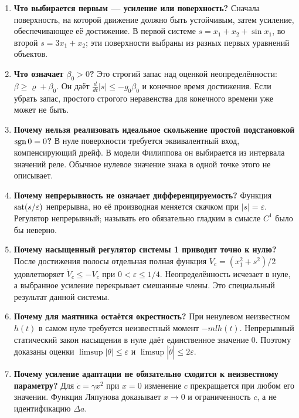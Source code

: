 \begin{enumerate}[resume]
\item \textbf{Что выбирается первым --- усиление или поверхность?}
Сначала поверхность, на которой движение должно быть устойчивым, затем
усиление, обеспечивающее её достижение. В первой системе
$s=x_1+x_2+\sin x_1$, во второй $s=3x_1+x_2$; эти поверхности выбраны
из разных первых уравнений объектов.

\item \textbf{Что означает $\beta_0>0$?}
Это строгий запас над оценкой неопределённости:
$\beta\ge\varrho+\beta_0$. Он даёт
$\frac{d}{dt}|s|\le-g_0\beta_0$ и конечное время достижения.
Если убрать запас, простого строгого неравенства для конечного времени
уже может не быть.

\item \textbf{Почему нельзя реализовать идеальное скольжение простой подстановкой $\operatorname{sgn}0=0$?}
В нуле поверхности требуется эквивалентный вход, компенсирующий дрейф.
В модели Филиппова он выбирается из интервала значений реле.
Обычное нулевое значение знака в одной точке этого не описывает.

\item \textbf{Почему непрерывность не означает дифференцируемость?}
Функция $\operatorname{sat}(s/\varepsilon)$ непрерывна, но её производная меняется скачком
при $|s|=\varepsilon$. Регулятор непрерывный; называть его обязательно
гладким в смысле $C^1$ было бы неверно.

\item \textbf{Почему насыщенный регулятор системы 1 приводит точно к нулю?}
После достижения полосы отдельная полная функция
$V_c=(x_1^2+s^2)/2$ удовлетворяет $\dot V_c\le-V_c$ при
$0<\varepsilon\le1/4$. Неопределённость исчезает в нуле,
а выбранное усиление перекрывает смешанные члены.
Это специальный результат данной системы.

\item \textbf{Почему для маятника остаётся окрестность?}
При ненулевом неизвестном $h(t)$ в самом нуле требуется неизвестный
момент $-mlh(t)$. Непрерывный статический закон насыщения в нуле даёт
единственное значение $0$. Поэтому доказаны оценки
$\limsup|\theta|\le\varepsilon$ и
$\limsup|\dot\theta|\le2\varepsilon$.

\item \textbf{Почему усиление адаптации не обязательно сходится к неизвестному параметру?}
Для $\dot c=\gamma x^2$ при $x=0$ изменение $c$ прекращается при любом его
значении. Функция Ляпунова доказывает $x\to0$ и ограниченность $c$,
а не идентификацию $\Delta a$.
\end{enumerate}

